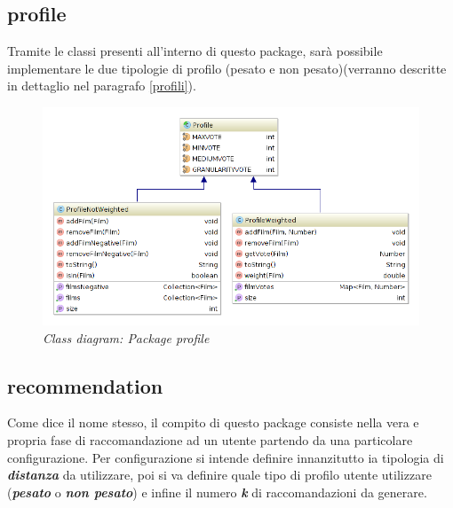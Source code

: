 \subsection{profile}
Tramite le classi presenti all'interno di questo package, sarà possibile implementare le due tipologie di profilo (pesato e non pesato)(verranno descritte in dettaglio nel paragrafo \ref{profili}).
\begin{figure}[H]
	\includegraphics[width=\textwidth]{./images/Diagrams/profile.png}
	\caption{\emph{Class diagram: Package profile}}
\end{figure}

\subsection{recommendation}
Come dice il nome stesso, il compito di questo package consiste nella vera e propria fase di raccomandazione ad un utente partendo da una particolare configurazione. Per configurazione si intende definire innanzitutto ia tipologia di \emph{\textbf{distanza}} da utilizzare, poi si va definire quale tipo di profilo utente utilizzare (\emph{\textbf{pesato}} o \emph{\textbf{non pesato}}) e infine il numero \emph{\textbf{k}} di raccomandazioni da generare.


